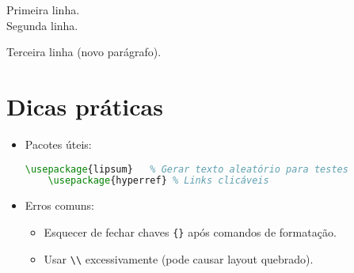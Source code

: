 Primeira linha.\\ Segunda linha.  
\par Terceira linha (novo parágrafo).



\section{Dicas práticas}

\begin{itemize}
    \item Pacotes úteis:
    \begin{lstlisting}[language=tex, caption=Outros pacotes úteis para texto e formatação]
    \usepackage{lipsum}   % Gerar texto aleatório para testes
    \usepackage{hyperref} % Links clicáveis
    \end{lstlisting}
    \item Erros comuns:
    \begin{itemize}
        \item Esquecer de fechar chaves \verb|{}| após comandos de formatação.
        \item Usar \verb|\\| excessivamente (pode causar layout quebrado).
    \end{itemize}
\end{itemize}

